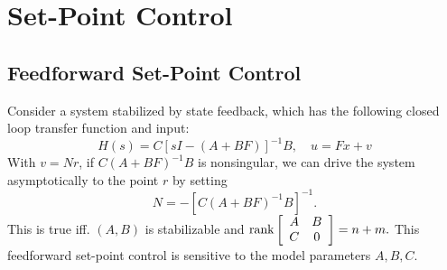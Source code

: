 \documentclass{report}
\begin{document}
\section{Set-Point Control}

\subsection{Feedforward Set-Point Control}
Consider a system stabilized by state feedback, which has the
following closed loop transfer function and input:
$$
H(s) = C[sI - (A + BF)]^{-1} B, \quad
u = F x + v
$$
With $v = N r$, if $C(A + BF)^{-1}B$ is nonsingular, we can drive the
system asymptotically to the point $r$ by setting
$$
N = -[C(A + BF)^{-1} B]^{-1}.
$$
This is true iff. $(A, B)$ is stabilizable and
$
\mathrm{rank}
\left[\begin{array}{c c}
  A & B \\
  C & 0
\end{array}\right] = n + m.
$
This feedforward set-point control is sensitive to the model
parameters $A, B, C$.
\end{document}
